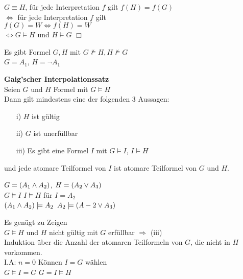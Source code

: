 \beweis{}
$G \equiv H$, für jede Interpretation $f$ gilt $f(H) = f(G)$\\
$\Leftrightarrow$ für jede Interpretation $f$ gilt\\
$f(G) = W \Leftrightarrow f(H) = W$\\
$\Leftrightarrow G \models H$ und $H \models G$ $\Box$

\beispiel{}
Es gibt Formel $G, H$ mit $G \not \models H, H \not \models G$\\
$G = A_1$, $H=\neg A_1$

 \textbf{Gaig'scher Interpolationssatz}\\
Seien $G$ und $H$ Formel mit $G \models H$\\
Dann gilt mindestens eine der folgenden 3 Aussagen:
\begin{itemize}
\item[i)] $H$ ist gültig
\item[ii)] $G$ ist unerfüllbar
\item[iii)] Es gibt eine Formel $I$ mit $G \models I$, $I \models H$
\end{itemize}
und jede atomare Teilformel von $I$ ist atomare Teilformel von $G$ und $H$.

\beispiel{}
$G = (A_1 \wedge A_2)$, $H = (A_2 \vee A_3)$\\
$G \models I$ \hspace{1cm} $I \models H$ \hspace{1cm} für $I= A_2$\\
$(A_1 \wedge A_2) \models A_2$ \hspace{1cm} $A_2 \models (A-2 \vee A_3)$

\beweis{}
Es genügt zu Zeigen\\
$G \models H$ und $H$ nicht gültig mit $G$ erfüllbar $\Rightarrow$ (iii)\\

\noindent
Induktion über die Anzahl der atomaren Teilformeln von $G$, die nicht in $H$ vorkommen.\\
I.A: $n=0$ \hspace{1cm} Können $I = G$ wählen\\
$G \models I = G$ \hspace{1cm} $G = I \models H$\\

